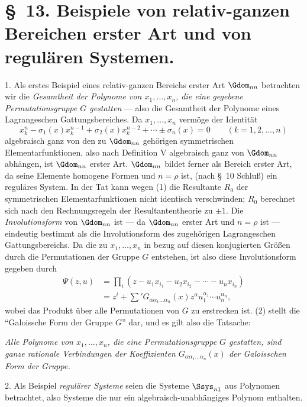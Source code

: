 \documentclass[11pt]{article}
\begin{document}
\section*{\S\ 13. Beispiele von relativ-ganzen Bereichen erster Art und von regulären Systemen.}

1. Als erstes Beispiel eines relativ-ganzen Bereichs erster Art $\Gdom_{nn}$ betrachten wir die \emph{Gesamtheit der Polynome von $x_1,
\ldots,x_n$, die eine gegebene Permutationsgruppe $G$ gestatten} --- also die Gesamtheit der Polynome eines Lagrangeschen Gattungsbereiches. Da $x_1,
\ldots,x_n$ vermöge der Identität
\begin{equation}
  x_k^n-\sigma_1(x)x_k^{n-1}+\sigma_2(x)x_k^{n-2}+\cdots\pm\sigma_n(x)=0
  \qquad(k=1,2,
\ldots,n)
\tag{1}
\end{equation}
algebraisch ganz von den zu $\Gdom_{nn}$ gehörigen symmetrischen Elementarfunktionen, also nach Definition V algebraisch ganz von $\Gdom_{nn}$ abhängen, ist $\Gdom_{nn}$ erster Art. $\Gdom_{nn}$ bildet ferner als Bereich erster Art, da seine Elemente homogene Formen und $n=\rho$ ist, (nach \S\ 10 Schluß) ein reguläres System. In der Tat kann wegen (1) die Resultante $R_0$ der symmetrischen Elementarfunktionen nicht identisch verschwinden; $R_0$ berechnet sich nach den Rechnungsregeln der Resultantentheorie zu $\pm1$. Die \emph{Involutionsform} von $\Gdom_{nn}$ ist --- da $\Gdom_{nn}$ erster Art und $n=\rho$ ist --- eindeutig bestimmt als die Involutionsform des zugehörigen Lagrangeschen Gattungsbereichs. Da die zu $x_1,
\ldots,x_n$ in bezug auf diesen konjugierten Größen durch die Permutationen der Gruppe $G$ entstehen, ist also diese Involutionsform gegeben durch
\begin{equation}
\begin{aligned}
  \Psi(z,u)&=\prod_i
  (z-u_1x_{i_1}-u_2x_{i_2}-\cdots-u_nx_{i_n})\\
  &=z^i+\sum{}'G_{\alpha\alpha_1\ldots\alpha_n}(x)
  z^\alpha u_1^{\alpha_1}\cdots u_n^{\alpha_n},
\end{aligned}
\tag{2}
\end{equation}
wobei das Produkt über alle Permutationen von $G$ zu erstrecken ist. (2) stellt die ``Galoissche Form der Gruppe $G$'' dar, und es gilt also die Tatsache:

\emph{Alle Polynome von $x_1,
\ldots,x_n$, die eine Permutationsgruppe $G$ gestatten, sind ganze rationale Verbindungen der Koeffizienten $G_{\alpha\alpha_1\ldots\alpha_n}(x)$ der Galoisschen Form der Gruppe.}

2. Als Beispiel \emph{regulärer Systeme} seien die Systeme $\Ssys_{n1}$ aus Polynomen betrachtet, also Systeme die nur ein algebraisch-unabhängiges Polynom enthalten.
\end{document}
